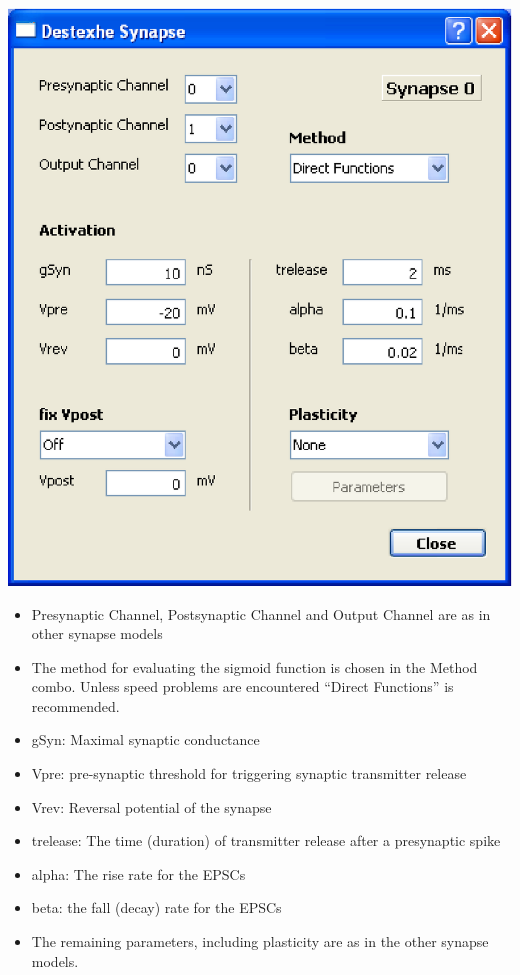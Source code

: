 \documentclass{article}
\begin{document}
\parbox[b]{0.48\textwidth}{
\includegraphics[scale=0.5]{destexheSynDialog} \\[1.5cm]}
\hfill
\parbox[b]{0.5\textwidth}{
\begin{itemize}
\item Presynaptic Channel, Postsynaptic Channel and Output Channel are
  as in other synapse models
\item The method for evaluating the sigmoid function is chosen in the
  Method combo. Unless speed problems are encountered ``Direct
  Functions'' is recommended.
\item gSyn: Maximal synaptic conductance
\item Vpre: pre-synaptic threshold for triggering synaptic transmitter
  release
\item Vrev: Reversal potential of the synapse
\item trelease: The time (duration) of transmitter release after a
  presynaptic spike
\item alpha: The rise rate for the EPSCs
\item beta: the fall (decay) rate for the EPSCs
\item The remaining parameters, including plasticity are as in the
  other synapse models.
\end{itemize}
}
\end{document}
